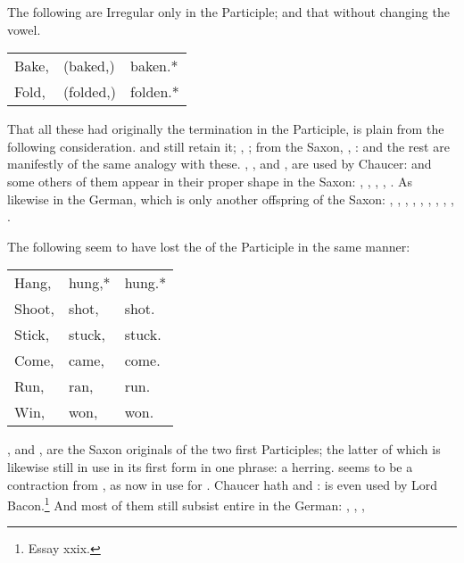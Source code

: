 The following are Irregular only in the Participle; and that without
changing the vowel.

\begin{tabular}[h]{lll}
  Bake, & (baked,) & baken.*\\
  Fold, & (folded,) & folden.*\footnotemark\\
\end{tabular}


That all these had originally the termination  in the Participle,
is plain from the following consideration.  and 
still retain it; , ; from the Saxon,
, : and the rest are manifestly of the same
analogy with these. , , and , are
used by Chaucer: and some others of them appear in their proper shape in
the Saxon: , , , ,
. As likewise in the German, which is only another offspring
of the Saxon: , , ,
, , , ,
, , .

The following seem to have lost the  of the Participle in the
same manner:

\begin{tabular}[h]{lll}
  Hang,\footnotemark & hung,* & hung.*\\
  Shoot, & shot, & shot.\\
  Stick, & stuck, & stuck.\\
  Come, & came, & come.\\
  Run, & ran, & run.\\
  Win, & won, & won.\\
\end{tabular}


, and , are the Saxon originals of the two first
Participles; the latter of which is likewise still in use in its first
form in one phrase: a  herring.  seems to be a
contraction from , as  now in use for
. Chaucer hath  and :  is
even used by Lord Bacon.\footnote{Essay xxix.} And most of them still
subsist entire in the German: , , ,

